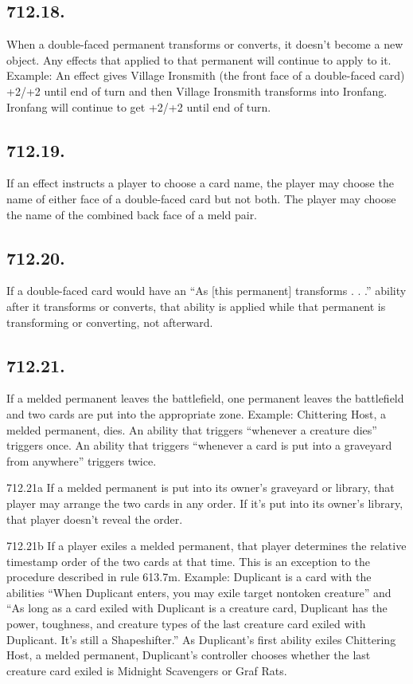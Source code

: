 \subsection*{712.18.}
When a double-faced permanent transforms or converts, it doesn’t become a new object. Any effects that applied to that permanent will continue to apply to it.
Example: An effect gives Village Ironsmith (the front face of a double-faced card) +2/+2 until end of turn and then Village Ironsmith transforms into Ironfang. Ironfang will continue to get +2/+2 until end of turn.

\subsection*{712.19.}
If an effect instructs a player to choose a card name, the player may choose the name of either face of a double-faced card but not both. The player may choose the name of the combined back face of a meld pair.

\subsection*{712.20.}
If a double-faced card would have an “As [this permanent] transforms . . .” ability after it transforms or converts, that ability is applied while that permanent is transforming or converting, not afterward.

\subsection*{712.21.}
If a melded permanent leaves the battlefield, one permanent leaves the battlefield and two cards are put into the appropriate zone.
Example: Chittering Host, a melded permanent, dies. An ability that triggers “whenever a creature dies” triggers once. An ability that triggers “whenever a card is put into a graveyard from anywhere” triggers twice.

712.21a If a melded permanent is put into its owner’s graveyard or library, that player may arrange the two cards in any order. If it’s put into its owner’s library, that player doesn’t reveal the order.

712.21b If a player exiles a melded permanent, that player determines the relative timestamp order of the two cards at that time. This is an exception to the procedure described in rule 613.7m.
Example: Duplicant is a card with the abilities “When Duplicant enters, you may exile target nontoken creature” and “As long as a card exiled with Duplicant is a creature card, Duplicant has the power, toughness, and creature types of the last creature card exiled with Duplicant. It’s still a Shapeshifter.” As Duplicant’s first ability exiles Chittering Host, a melded permanent, Duplicant’s controller chooses whether the last creature card exiled is Midnight Scavengers or Graf Rats.

